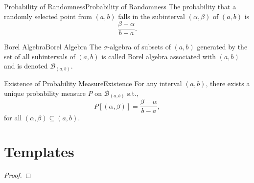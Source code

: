 \documentclass{elegantbook}
\begin{document}
\begin{theorem}{Probability of Randomness}{Probability of Randomness}
The probability that a randomly selected point from $(a,b)$ falls in the subinterval $(\alpha,\beta)$ of $(a,b)$ is $$\frac{\beta-\alpha}{b-a}.$$

\end{theorem}

\begin{definition}{Borel Algebra}{Borel Algebra}
The $\sigma$-algebra of subsets of $(a,b)$ generated by the set of all subintervals of $(a,b)$ is called Borel algebra associated with $(a,b)$ and is denoted $\mathcal{B}_{(a,b)}$.
\end{definition}

\begin{theorem}{Existence of Probability Measure}{Existence}
For any interval $(a,b)$, there exists a unique probability measure $P$ on $\mathcal{B}_{(a,b)}$ s.t., $$P\left[(\alpha,\beta)\right]=\frac{\beta-\alpha}{b-a},$$
for all $(\alpha,\beta)\subseteq(a,b)$.
\end{theorem}




\chapter{Templates}
\begin{definition}{}{}

\end{definition}

\begin{theorem}{}{}

\end{theorem}

\begin{corollary}{}{}

\end{corollary}

\begin{lemma}{}{}

\end{lemma}

\begin{proof}

\end{proof}

\begin{remark}

\end{remark}
\end{document}
